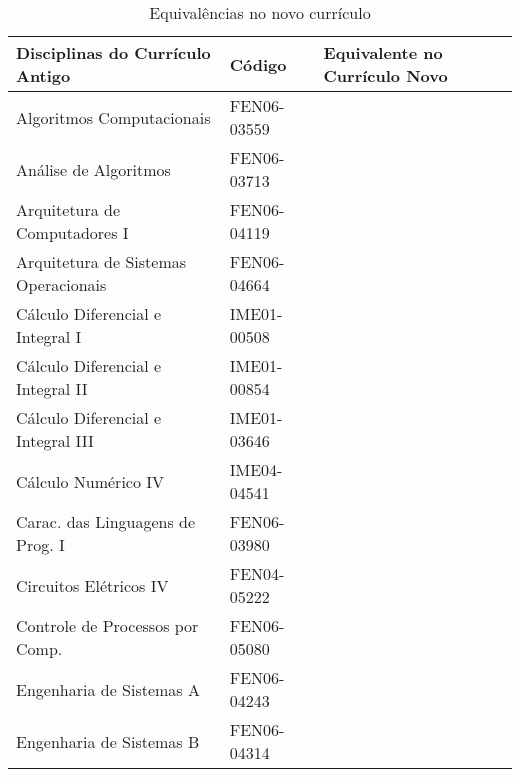 \begin{table}
	\centering
	\renewcommand{\arraystretch}{1.5}
	\caption{Equivalências no novo currículo}
	\label{equivalencias}
	\begin{tabularx}{\textwidth}{|X|l||l|}
		\hline
		{\textbf{Disciplinas do Currículo Antigo}}                & \textbf{Código}             & \textbf{Equivalente no Currículo Novo} \\
		\hline
		Algoritmos Computacionais                                 & FEN06-03559                 & \AlgComp                               \\
		Análise de Algoritmos                                     & FEN06-03713                 & \AnAlg                                 \\
		Arquitetura de Computadores I                             & FEN06-04119                 & \ArqComp                               \\
		Arquitetura de Sistemas Operacionais                      & FEN06-04664                 & \ProjSO                                \\
		Cálculo Diferencial e Integral I                          & IME01-00508                 & \CalcI                                 \\
		Cálculo Diferencial e Integral II                         & IME01-00854                 & \CalcII                                \\
		Cálculo Diferencial e Integral III                        & IME01-03646                 & \CalcIII                               \\
		Cálculo Numérico IV                                       & IME04-04541                 & \EngComput                             \\
		Carac. das Linguagens de Prog. I                          & FEN06-03980                 & \LabProgB                              \\
		Circuitos Elétricos IV                                    & FEN04-05222                 & \CEVI                                  \e de Processos por Comp.                           & FEN06-05080                 & \Control                               \\
		Engenharia de Sistemas A                                  & FEN06-04243                 & \EngSistA                              \\
		Engenharia de Sistemas B                                  & FEN06-04314                 & \ProjBD                                \\

\end{tabularx}
\end{table}
